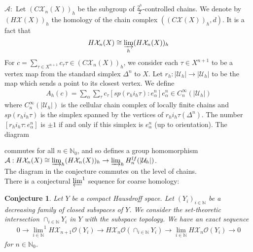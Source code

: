\documentclass[a4paper,11pt]{article}
\theoremstyle{definition}
\theoremstyle{plain}
\newtheorem{conjecture}[definition]{Conjecture}
\theoremstyle{remark}
\begin{document}
{$\mathcal{A}:$ Let $(C\mathcal{X}_{n}(X))_{h}$ be the subgroup of $\frac{2^h}{2}$-controlled chains. We denote by $(H\mathcal{X}(X))_{h}$ the homology of the chain complex $((C\mathcal{X}(X))_{h},d)$. It is a fact that
\begin{align*}
H\mathcal{X}_{n}(X) \cong \varinjlim_{h} (H\mathcal{X}_{n}(X))_{h}
\end{align*}
 For $c = \sum_{\tau \in X^{n+1}} c_{\tau}\tau \in (C\mathcal{X}_{n}(X))_{h}$, we consider each $\tau \in X^{n+1}$ to be a vertex map from the standard simplex $\Delta^n$ to $X$.  Let $r_{h}: |\mathcal{U}_{h}|\rightarrow |\mathcal{U}_{h}|$ to be the map which sends a point to its closest vertex. We define
\begin{align*}
A_{h}(c) = \sum_{\alpha} \sum_{\tau} c_{\tau} [sp(r_{h}i_{h}\tau): e^n_{\alpha}] e^n_{\alpha} \in C^{\infty}_{n}(|\mathcal{U}_{h}|)
\end{align*}
where $C^{\infty}_{n}(|\mathcal{U}_{h}|)$ is the cellular chain complex of locally finite  chains and $sp(r_{h}i_{h}\tau)$ is the simplex spanned by the vertices of $r_{h}i_{h}\tau(\Delta^n)$. The number $ [r_{h}i_{h} \tau: e^n_{\alpha}]$ is $\pm 1$ if and only if this simplex is $e^n_{\alpha}$ (up to orientation). The diagram 
\begin{figure}[H]
\centering
{}
\end{figure}
 commutes for all $n\in \mathbb{N}_{0}$, and so defines a group homomorphism $\mathcal{A}: H\mathcal{X}_{n}(X) \cong \varinjlim_{h} (H\mathcal{X}_{n}(X))_{h}\rightarrow \varinjlim_{h} H^{lf}_{n}(|\mathcal{U}_{h}|)$. \\

The diagram in the conjecture commutes on the level of chains. \\

There is a conjectural $\varprojlim^1$ sequence for coarse homology: 

\begin{conjecture}  \label{shapeex} Let $Y$ be a compact Hausdroff space. Let $(Y_{i})_{i\in \mathbb{N}}$ be a decreasing family of closed subspaces of $Y$. We consider the set-theoretic intersection $\cap_{i\in \mathbb{N}} Y_{i}$ in $Y$ with the subspace topology. We have an exact sequence
\begin{align*}
0\rightarrow {\lim_{i\in \mathbb{N}}}^{1} H\mathcal{X}_{n+1}\mathcal{O}(Y_{i}) \rightarrow H\mathcal{X}_{n}\mathcal{O} (\cap_{i\in \mathbb{N}} Y_{i}) \rightarrow  \lim_{i\in \mathbb{N}} H\mathcal{X}_{n}\mathcal{O}(Y_{i}) \rightarrow 0
\end{align*}
for $n\in \mathbb{N}_{0}$.
\end{conjecture}

}
\end{document}

